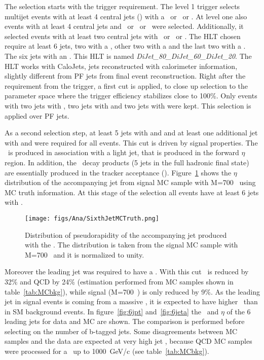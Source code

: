 The selection starts with the trigger requirement. The level 1 trigger selects multijet events with at least 4 central jets () with a ~or ~or . At level one also events with at least 4 central jets and ~or ~or ~were selected. Additionally, it selected events with at least two central jets with ~or ~or . The HLT chosen require at least 6 jets, two with a , other two with a  and the last two with a . The six jets with an . This HLT is named \textit{DiJet\_80\_DiJet\_60\_DiJet\_20}. The HLT works with CaloJets, jets reconstructed with calorimeter information, slightly different from PF jets from final event reconstruction. Right after the requirement from the trigger, a first cut is applied, to close up selection to the parameter space where the trigger efficiency stabilizes close to 100\%. Only events with two jets with , two jets with  and two jets with  were kept. This selection is applied over PF jets. %

As a second selection step, at least 5 jets with  and  and at least one additional jet with  and  were required for all events. This cut is driven by signal properties. The \Tp~is produced in association with a light jet, that is produced in the forward $\eta$ region. In addition, the \Tp~decay products (5 jets in the full hadronic final state) are essentially produced in the tracker acceptance (). Figure~\ref{fig:SixthJetTp} shows the $\eta$ distribution of the accompanying jet from signal MC sample with M=700 \GeVcc~using MC truth information. At this stage of the selection all events have at least 6 jets with . %

\begin{figure}[!Hhtbp]
  \begin{center}
    \texttt{[image: figs/Ana/SixthJetMCTruth.png]}
    \caption{Distribution of pseudorapidity of the accompanying jet produced with the \Tp. The distribution is taken from the signal MC sample with M=700 \GeVcc~and it is normalized to unity.}
    \label{fig:SixthJetTp}
  \end{center}
\end{figure}

Moreover the leading jet was required to have a . With this cut \ttbar~is reduced by 32\% and QCD by 24\% (estimation performed from MC samples shown in table~\ref{tab:MCbkg}), while signal (M=700~\GeVcc) is only reduced by 9\%. As the leading jet in signal events is coming from a massive \Tp, it is expected to have higher \pt~than in SM background events. In figure~\ref{fig:6jpt} and~\ref{fig:6jeta} the \pt~and $\eta$ of the 6 leading jets for data and MC are shown. The comparison is performed before selecting on the number of b-tagged jets. Some disagreements between MC samples and the data are expected at very high jet \pt, because QCD MC samples were processed for a \pt~up to 1000~GeV/c (see table~\ref{tab:MCbkg}). 

